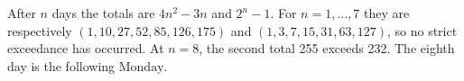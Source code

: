 After $n$ days the totals are $4n^2-3n$ and $2^n-1$. For $n=1,\ldots,7$ they are respectively $(1,10,27,52,85,126,175)$ and $(1,3,7,15,31,63,127)$, so no strict exceedance has occurred. At $n=8$, the second total 255 exceeds 232. The eighth day is the following $\boxed{\text{Monday}}$.
